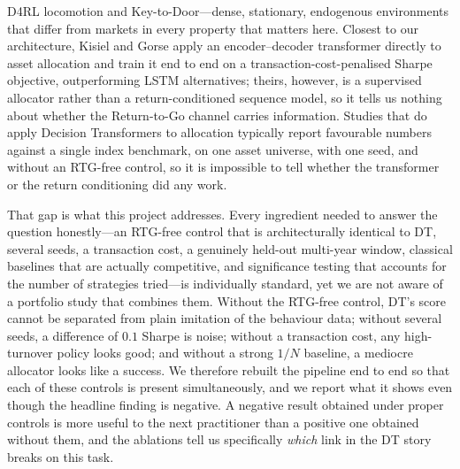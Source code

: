 \documentclass[11pt]{article}
\begin{document}
D4RL locomotion and Key-to-Door---dense, stationary, endogenous environments that differ from
markets in every property that matters here. Closest to our architecture, Kisiel and Gorse
\cite{kisiel2022portfolio} apply an encoder--decoder transformer directly to asset allocation
and train it end to end on a transaction-cost-penalised Sharpe objective, outperforming LSTM
alternatives; theirs, however, is a supervised allocator rather than a return-conditioned
sequence model, so it tells us nothing about whether the Return-to-Go channel carries
information. Studies that do apply Decision Transformers to allocation typically report
favourable numbers against a single index benchmark, on one asset universe, with one seed, and
without an RTG-free control, so it is impossible to tell whether the transformer or the return
conditioning did any work.

That gap is what this project addresses. Every ingredient needed to answer the question
honestly---an RTG-free control that is architecturally identical to DT, several seeds, a
transaction cost, a genuinely held-out multi-year window, classical baselines that are
actually competitive, and significance testing that accounts for the number of strategies
tried---is individually standard, yet we are not aware of a portfolio study that combines them.
Without the RTG-free control, DT's score cannot be separated from plain imitation of the
behaviour data; without several seeds, a difference of $0.1$ Sharpe is noise; without a
transaction cost, any high-turnover policy looks good; and without a strong $1/N$ baseline,
a mediocre allocator looks like a success. We therefore rebuilt the pipeline end to end so
that each of these controls is present simultaneously, and we report what it shows even
though the headline finding is negative. A negative result obtained under proper controls is
more useful to the next practitioner than a positive one obtained without them, and the
ablations tell us specifically \emph{which} link in the DT story breaks on this task.
\end{document}
